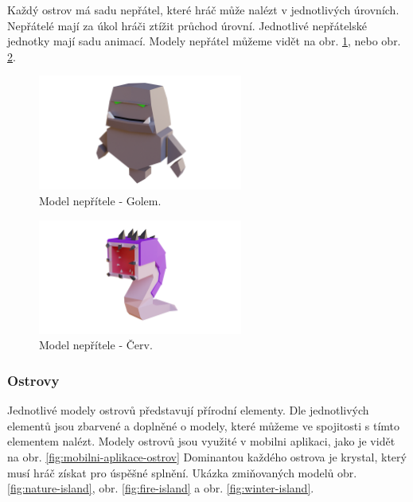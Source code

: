 Každý ostrov má sadu nepřátel, které hráč může nalézt v jednotlivých úrovních. Nepřátelé mají za úkol hráči ztížit průchod úrovní. Jednotlivé nepřátelské jednotky mají sadu animací. Modely nepřátel můžeme vidět na obr. \ref{fig:nepritel-golem}, nebo obr. \ref{fig:nepritel-cerv}.

\begin{figure}[h]
    \centering
    \includegraphics[width=0.6\textwidth]{img/nepritel-golem.png}
    \caption{Model nepřítele - Golem.}
    \label{fig:nepritel-golem}
\end{figure}

\begin{figure}[h]
    \centering
    \includegraphics[width=0.6\textwidth]{img/nepritel-cerv.png}
    \caption{Model nepřítele - Červ.}
    \label{fig:nepritel-cerv}
\end{figure}

\subsubsection{Ostrovy}
Jednotlivé modely ostrovů představují přírodní elementy. Dle jednotlivých elementů jsou zbarvené a doplněné o modely, které můžeme ve spojitosti s tímto elementem nalézt. Modely ostrovů jsou využité v mobilni aplikaci, jako je vidět na obr. \ref{fig:mobilni-aplikace-ostrov} Dominantou každého ostrova je krystal, který musí hráč získat pro úspěšné splnění. Ukázka zmiňovaných modelů obr. \ref{fig:nature-island}, obr. \ref{fig:fire-island} a obr. \ref{fig:winter-island}.

